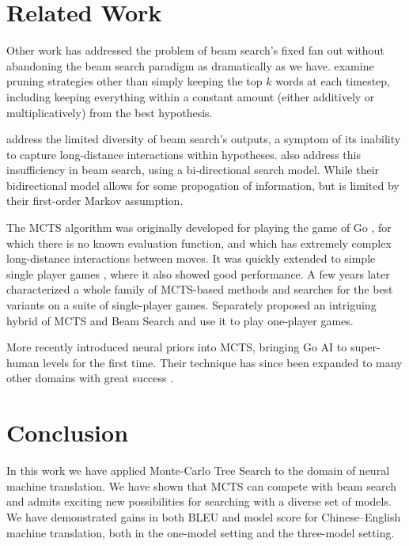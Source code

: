 \documentclass[11pt,a4paper]{article}
\begin{document}
\section{Related Work}
\label{sec:related_work}
Other work has addressed the problem of beam search's fixed fan out without
abandoning the beam search paradigm as dramatically as we have.
 examine pruning strategies other than simply keeping
the top $k$ words at each timestep, including keeping everything within a
constant amount (either additively or multiplicatively) from the best
hypothesis.

 address the limited diversity of beam search's
outputs, a symptom of its inability to capture long-distance interactions
within hypotheses.  also address this
insufficiency in beam search, using a bi-directional search model. While their
bidirectional model allows for some propogation of information, but is limited
by their first-order Markov assumption.

The MCTS algorithm was originally developed for playing the game of Go
\cite{coulom2006efficient}, for which there is no known evaluation function,
and which has extremely complex long-distance interactions between moves. It
was quickly extended to simple single player games \cite{schadd2008single},
where it also showed good performance. A few years later
 characterized a whole family of MCTS-based methods and
searches for the best variants on a suite of single-player games. Separately
 proposed an intriguing hybrid of MCTS and Beam Search
and use it to play one-player games.

More recently  introduced neural priors into MCTS,
bringing Go AI to super-human levels for the first time. Their technique has
since been expanded to many other domains with great success \cite[inter
alia]{silver2017mastering,pinheiro2017geometric,lee2018deep,luckow2018monte}.

\section{Conclusion}
In this work we have applied Monte-Carlo Tree Search to the domain of neural
machine translation.
We have shown that MCTS can compete with beam search and admits exciting new
possibilities for searching with a diverse set of models.
We have demonstrated gains in both BLEU and model score for Chinese--English
machine translation, both in the one-model setting and the three-model setting.
\end{document}

